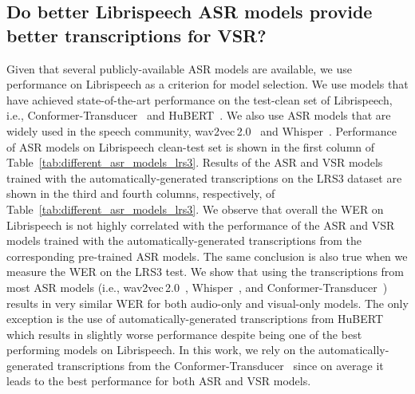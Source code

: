 \subsection{Do better Librispeech ASR models provide better transcriptions for VSR?}
Given that several publicly-available ASR models are available, we use performance on Librispeech as a criterion for model selection. We use models that have achieved state-of-the-art performance on the test-clean set of Librispeech, i.e., Conformer-Transducer~\cite{DBLP:journals/corr/abs-1909-09577} and HuBERT~\cite{hsu2021hubert}. We also use  ASR models that are widely used in the speech community, wav2vec\,2.0~\cite{baevski2020wav2vec} and Whisper~\cite{radford2018improving}.
Performance of ASR models on Librispeech clean-test set is shown in the first column of Table~\ref{tab:different_asr_models_lrs3}. 
Results of the ASR and VSR models trained with the automatically-generated transcriptions on the LRS3 dataset are shown in the third and fourth columns, respectively, of Table~\ref{tab:different_asr_models_lrs3}.
We observe that overall the WER on Librispeech is not highly correlated with the performance of the ASR and VSR models trained with the automatically-generated transcriptions from the corresponding pre-trained ASR models. The same conclusion is also true when we measure the WER on the LRS3 test. We show that using the transcriptions from most ASR models (i.e., wav2vec\,2.0~\cite{baevski2020wav2vec}, Whisper~\cite{radford2018improving}, and Conformer-Transducer~\cite{DBLP:journals/corr/abs-1909-09577}) results in very similar WER for both audio-only and visual-only models. The only exception is the use of automatically-generated transcriptions from HuBERT~\cite{hsu2021hubert} which results in slightly worse performance despite being one of the best performing models on Librispeech. 
In this work, we rely on the automatically-generated transcriptions from the Conformer-Transducer~\cite{DBLP:journals/corr/abs-1909-09577} since on average it leads to the best performance for both ASR and VSR models.

\vspace{-1mm}
